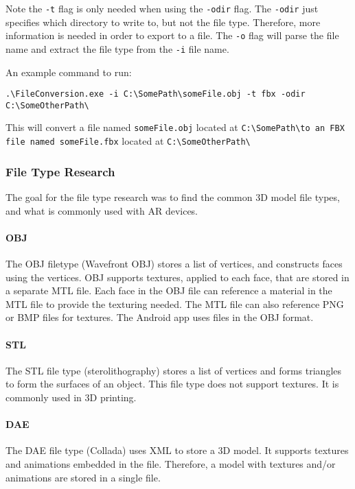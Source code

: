     Note the \texttt{-t} flag is only needed when using the \texttt{-odir} flag.  The \texttt{-odir} just specifies which directory to write to, but not the file type.
    Therefore, more information is needed in order to export to a file.  The \texttt{-o} flag will parse the file name and extract the file type from the \texttt{-i} file name.
    
    An example command to run:
    
    \begin{center}
        \texttt{.\textbackslash FileConversion.exe -i C:\textbackslash SomePath\textbackslash someFile.obj -t fbx -odir C:\textbackslash SomeOtherPath\textbackslash}
    \end{center}
    
    This will convert a file named \texttt{someFile.obj} located at \texttt{C:\textbackslash SomePath\textbackslash  to an FBX file named someFile.fbx} located at 
    \texttt{C:\textbackslash SomeOtherPath\textbackslash}
    
    \subsubsection{File Type Research}

    The goal for the file type research was to find the common 3D model file types, and what is commonly used with AR devices.

    \paragraph{OBJ}
    The OBJ filetype (Wavefront OBJ) stores a list of vertices, and constructs faces using the vertices.  OBJ supports textures, applied to each face, that are stored in a separate MTL file.  Each face in the OBJ file can reference a material in the MTL file to provide the texturing needed. The MTL file can also reference PNG or BMP files for textures. The Android app uses files in the OBJ format.

    \paragraph{STL}
    The STL file type (sterolithography) stores a list of vertices and forms triangles to form the surfaces of an object.  This file type does not support textures.  It is commonly used in 3D printing.

    \paragraph{DAE}
    The DAE file type (Collada) uses XML to store a 3D model.  It supports textures and animations embedded in the file.  Therefore, a model with textures and/or animations are stored in a single file.


